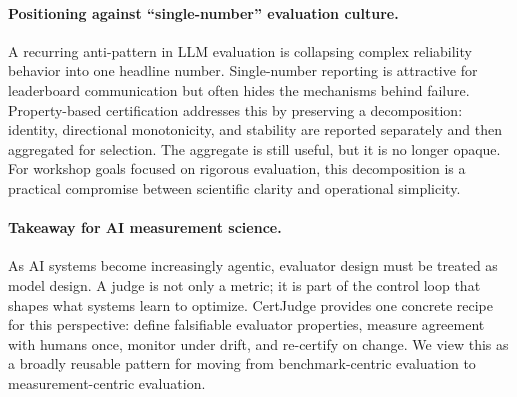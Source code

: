 \paragraph{Positioning against ``single-number'' evaluation culture.}
A recurring anti-pattern in LLM evaluation is collapsing complex reliability behavior into one headline number.
Single-number reporting is attractive for leaderboard communication but often hides the mechanisms behind failure.
Property-based certification addresses this by preserving a decomposition:
identity, directional monotonicity, and stability are reported separately and then aggregated for selection.
The aggregate is still useful, but it is no longer opaque.
For workshop goals focused on rigorous evaluation, this decomposition is a practical compromise between scientific clarity and operational simplicity.

\paragraph{Takeaway for AI measurement science.}
As AI systems become increasingly agentic, evaluator design must be treated as model design.
A judge is not only a metric; it is part of the control loop that shapes what systems learn to optimize.
CertJudge provides one concrete recipe for this perspective:
define falsifiable evaluator properties, measure agreement with humans once, monitor under drift, and re-certify on change.
We view this as a broadly reusable pattern for moving from benchmark-centric evaluation to measurement-centric evaluation.
